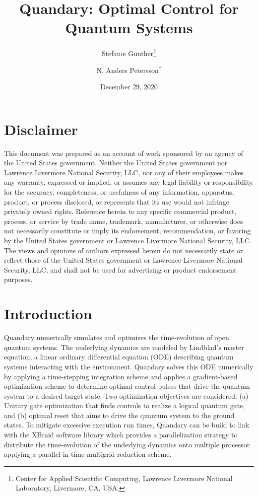 \documentclass[11pt]{article}
\title{Quandary: Optimal Control for Quantum Systems}
\author{Stefanie G{\"u}nther\thanks{Center for Applied Scientific Computing, Lawrence Livermore
    National Laboratory, Livermore, CA, USA.} \and N. Anders Petersson$^*$}
\date{December 29, 2020}
\begin{document}
\maketitle

\section*{Disclaimer}
This document was prepared as an account of work sponsored by an agency of the United States
government. Neither the United States government nor Lawrence Livermore National Security, LLC,
nor any of their employees makes any warranty, expressed or implied, or assumes any legal
liability or responsibility for the accuracy, completeness, or usefulness of any information,
apparatus, product, or process disclosed, or represents that its use would not infringe
privately owned rights. Reference herein to any specific commercial product, process, or service
by trade name, trademark, manufacturer, or otherwise does not necessarily constitute or imply
its endorsement, recommendation, or favoring by the United States government or Lawrence
Livermore National Security, LLC. The views and opinions of authors expressed herein do not
necessarily state or reflect those of the United States government or Lawrence Livermore
National Security, LLC, and shall not be used for advertising or product endorsement purposes.


\section{Introduction}
Quandary numerically simulates and optimizes the time-evolution of open quantum systems. The
underlying dynamics are modeled by Lindblad's master equation, a linear ordinary differential
equation (ODE) describing quantum systems interacting with the environment. Quandary solves this ODE
numerically by applying a time-stepping integration scheme and applies a gradient-based optimization
scheme to determine optimal control pulses that drive the quantum system to a desired target state.
Two optimization objectives are considered: (a) Unitary gate optimization that finds controls to
realize a logical quantum gate, and (b) optimal reset that aims to drive the quantum system to the
ground states.
To mitigate excessive execution run times, Quandary can be build to link with the XBraid software
library which provides a parallelization strategy to distribute the time-evolution of the underlying
dynamics onto multiple processor applying a parallel-in-time multigrid reduction scheme.
\end{document}
